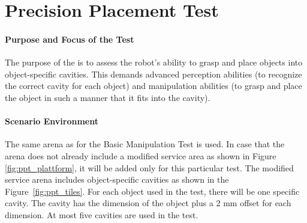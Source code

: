 \newpage
\section{Precision Placement Test}

\paragraph{Purpose and Focus of the Test}
The purpose of the  is to assess the robot's ability to grasp and place objects into object-specific cavities. This demands advanced perception abilities (to recognize the correct cavity for each object) and manipulation abilities (to grasp and place the object in such a manner that it fits into the cavity).

\paragraph{Scenario Environment}
The same arena as for the Basic Manipulation Test is used. In case that the arena does not already include a modified service area as shown in Figure \ref{fig:ppt_plattform}, it will be added only for this particular test. The modified service arena includes object-specific cavities as shown in the Figure~\ref{fig:ppt_tiles}. For each object used in the test, there will be one specific cavity. The cavity has the dimension of the object plus a 2 mm offset for each dimension. At most five cavities are used in the test.


